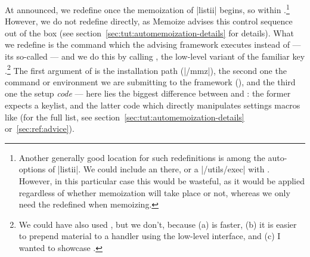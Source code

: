 \documentclass[a4paper,11pt]{article}
\begin{document}
At announced, we redefine  once the memoization of |listii| begins,
so within .\footnote{Another generally good
  location for such redefinitions is among the auto-options of |listii|.  We
  could include an  there, or a |/utils/exec|
  with .  However, in this particular case this would be
  wasteful, as it would be applied regardless of whether memoization will take
  place or not, whereas we only need the redefined  when memoizing.}
However, we do not redefine  directly, as Memoize advises this
control sequence out of the box (see
section~\ref{sec:tut:automemoization-details} for details).  What we redefine
is the command which the advising framework executes instead of  ---
its so-called  --- and we do this by calling
, the low-level variant of the familiar key
.\footnote{We could have also used , but we don't,
  because (a)  is faster, (b) it is easier to prepend
  material to a handler using the low-level interface, and (c) I wanted to
  showcase .}  The first argument of 
is the installation path (|/mmz|), the second one the command or environment we
are submitting to the framework (), and the third one the setup
\emph{code} --- here lies the biggest difference between  and
: the former expects a keylist, and the latter 
code which directly manipulates settings macros like
 (for the full list, see
section~\ref{sec:tut:automemoization-details} or~\ref{sec:ref:advice}).

\end{document}
